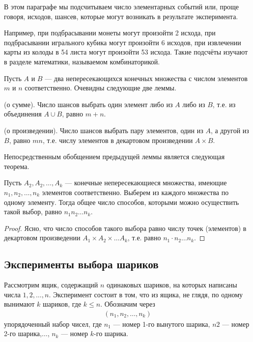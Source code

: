 
В этом параграфе мы подсчитываем число элементарных событий или, проще говоря, исходов, шансев, которые могут возникать в результате эксперимента. 

Например, при подбрасывании монеты могут произойти 2 исхода,
при подбрасывании игрального кубика могут произойти 6 исходов, при извлечении карты из колоды в 54 листа могут произойти 53 исхода. Такие подсчёты изучают в разделе математики, называемом комбинаторикой.

Пусть $A$ и $B$ — два непересекающихся конечных множества с числом
элементов $m$ и $n$ соответственно. Очевидны следующие две леммы.



\begin{lemma}(о сумме). Число шансов выбрать один элемент либо из $A$
либо из $B$, т.е. из объединения $A\cup B$, равно $m+n$.
\end{lemma}
\begin{lemma}(о произведении). Число шансов выбрать пару элементов,
один из $A$, а другой из $B$, равно $mn$, т.е. числу элементов в декартовом
произведении $A\times B$.
\end{lemma}
Непосредственным обобщением предыдущей леммы является следующая
теорема.
\begin{theorem}
\label{t:1}
Пусть $A_2,A_2,\dots,A_k$ — конечные непересекающиеся множества, имеющие $n_1
,n_2, \dots, n_k$ элементов соответственно. Выберем из
каждого множества по одному элементу. Тогда общее число способов, которыми можно осуществить такой выбор, равно $n_1n_2\dots n_k$.
\end{theorem}
\begin{proof}

Ясно, что число способов такого выбора равно числу точек (элементов) в декартовом произведении $A_1\times A_2\times\dots A_k$, т.е. равно $
n_1\cdot n_2\dots n_k$.
\end{proof}
\subsection{Эксперименты выбора шариков}

Рассмотрим ящик, содержащий $n$ одинаковых шариков, на которых написаны
числа $1, 2,\dots, n$. Эксперимент состоит в том, что из ящика, не глядя, по
одному вынимают $k$ шариков, где $k\leqslant n$. Обозначим через
\begin{gather*}
(n_1, n_2,\dots, n_k)
\end{gather*}
упорядоченный набор чисел, где $n_1$ — номер 1-го вынутого шарика, $n2$ —
номер 2-го шарика,$\dots$, $n_k$ — номер $k$-го шарика.

